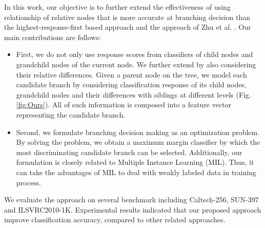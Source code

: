 \documentclass[review]{elsarticle}
\begin{document}
In this work, our objective is to further extend the effectiveness of using relationship of relative nodes that is more accurate at branching decision than the highest-response-first based approach and the approach of Zhu et al. \cite{Zhu.CVIU2014}.
Our main contributions are follows:
\begin{itemize}
\item First, we do not only use response scores from classifiers of child nodes and grandchild nodes of the current node. We further extend by also considering their relative differences. Given a parent node on the tree, we model each candidate branch by considering classification response of its child nodes, grandchild nodes and their differences with siblings at different levels (Fig. \ref{fig:Ours}). All of such information is composed into a feature vector representing the candidate branch. 
\item Second, we formulate branching decision making as an optimization problem. By solving the problem, we obtain a maximum margin classifier by which the most discriminating candidate branch can be selected. Additionally, our formulation is closely related to Multiple Instance Learning (MIL). Thus, it can take the advantages of MIL to deal with weakly labeled data in training process.
\end{itemize}
We evaluate the approach on several benchmark including Caltech-256, SUN-397 and ILSVRC2010-1K. Experimental results indicated that our proposed approach improve classification accuracy, compared to other related approaches.
\end{document}
